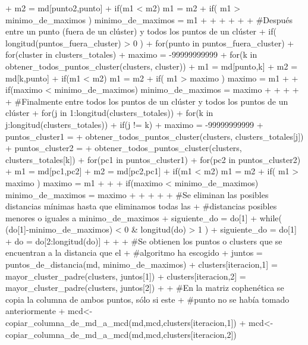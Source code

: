 \documentclass[parskip=full]{scrartcl}
\begin{document}
\begin{Schunk}
\begin{Sinput}
{{{{{{{+               m2 = md[punto2,punto]
+               if(m1 < m2){ m1 = m2 }
+               if( m1 > minimo_de_maximos ){ minimo_de_maximos = m1 }
+             }
+           }
+         }
+       }
+       
+       #Después entre un punto (fuera de un clúster) y todos los puntos de un clúster
+       if( longitud(puntos_fuera_cluster) > 0 ) {
+         for(punto in puntos_fuera_cluster){
+           for(cluster in clusters_totales) {
+             maximo = -99999999999
+             for(k in obtener_todos_puntos_cluster(clusters, cluster)) {
+               m1 = md[punto,k]
+               m2 = md[k,punto]
+               if(m1 < m2){ m1 = m2 }
+               if( m1 > maximo ){ maximo = m1 }
+             }
+             if(maximo < minimo_de_maximos){ minimo_de_maximos = maximo }
+           }
+         }
+       }
+       
+       #Finalmente entre todos los puntos de un clúster y todos los puntos de un clúster
+       for(j in 1:longitud(clusters_totales)){
+         for(k in j:longitud(clusters_totales)) {
+           if(j != k){
+             maximo = -99999999999
+             puntos_cluster1 = 
+ 			obtener_todos_puntos_cluster(clusters, clusters_totales[j])
+             puntos_cluster2 = 
+ 			obtener_todos_puntos_cluster(clusters, clusters_totales[k])
+             for(pc1 in puntos_cluster1){
+               for(pc2 in puntos_cluster2){
+                 m1 = md[pc1,pc2]
+                 m2 = md[pc2,pc1]
+                 if(m1 < m2){ m1 = m2 }
+                 if( m1 > maximo ){ maximo = m1 }
+               }
+             }
+             if(maximo < minimo_de_maximos){ minimo_de_maximos = maximo }
+           }
+         }
+       }
+       
+       #Se eliminan las posibles distancias mínimas hasta que eliminamos todas las
+       #distancias posibles menores o iguales a minimo_de_maximos
+       siguiente_do = do[1]
+       while( (do[1]-minimo_de_maximos) < 0 & longitud(do) > 1 ) { 
+         siguiente_do = do[1]
+         do = do[2:longitud(do)] 
+       }
+       
+       #Se obtienen los puntos o clusters que se encuentran a la distancia que el
+       #algoritmo ha escogido
+       juntos = puntos_de_distancia(md, minimo_de_maximos)
+       clusters[iteracion,1] = mayor_cluster_padre(clusters, juntos[1])
+       clusters[iteracion,2] = mayor_cluster_padre(clusters, juntos[2])
+       
+       #En la matriz cophenética se copia la columna de ambos puntos, sólo si este
+       #punto no se había tomado anteriormente
+       mcd<-copiar_columna_de_md_a_mcd(md,mcd,clusters[iteracion,1])
+       mcd<-copiar_columna_de_md_a_mcd(md,mcd,clusters[iteracion,2])
}}}
\end{Sinput}
\end{Schunk}
\end{document}

